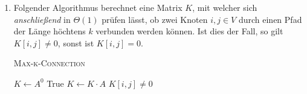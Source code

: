 \documentclass[a4paper]{scrartcl}
\begin{document}
\begin{enumerate}
    \item
        Folgender Algorithmus berechnet eine Matrix $K$, mit welcher sich
        \emph{anschließend} in $\Theta(1)$ prüfen lässt, ob zwei Knoten
        $i,j \in V$ durch einen Pfad der Länge höchtens $k$ verbunden werden
        können.
        Ist dies der Fall, so gilt $K[i,j] \neq 0$, sonst ist $K[i,j] = 0$.
        \begin{algorithm}
            \caption{\textsc{Max-k-Connection}}
            \begin{algorithmic}[1]
                    \State $K \gets A^0$
                            \State \Return True
                        \EndIf
                        \State $K \gets K \cdot A$
                    \EndFor
                    \State \Return $K[i,j] \neq 0$
                \EndProcedure
            \end{algorithmic}
        \end{algorithm}

\end{enumerate}
\end{document}
